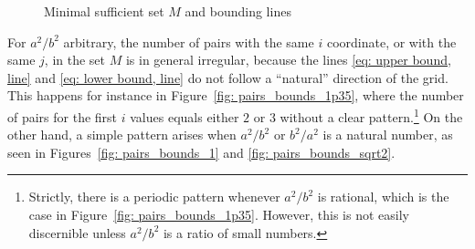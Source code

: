 \documentclass[12pt, a4paper]{article}
\newcommand{\mss}{M}
\begin{document}
\begin{figure}
{}\hfill%
%
\caption{Minimal sufficient set $\mss$ and bounding lines
}%
\label{fig: pairs_bounds}%
\end{figure}%
 
For $a^2/b^2$ arbitrary, the number of pairs with the same $i$ coordinate, or with the same $j$, in the set $\mss$ is in general irregular, because the lines \eqref{eq: upper bound, line} and \eqref{eq: lower bound, line} do not follow a ``natural'' direction of the grid. This happens for instance in Figure~\ref{fig: pairs_bounds_1p35}, where the number of pairs for the first $i$ values equals either $2$ or $3$ without a clear pattern.\footnote{Strictly, there is a periodic pattern whenever $a^2/b^2$ is rational, which is the case in Figure~\ref{fig: pairs_bounds_1p35}. However, this is not easily discernible unless $a^2/b^2$ is a ratio of small numbers.}
On the other hand, a simple pattern arises when $a^2/b^2$ or $b^2/a^2$ is a natural number, as seen in Figures~\ref{fig: pairs_bounds_1} and \ref{fig: pairs_bounds_sqrt2}.
\end{document}
